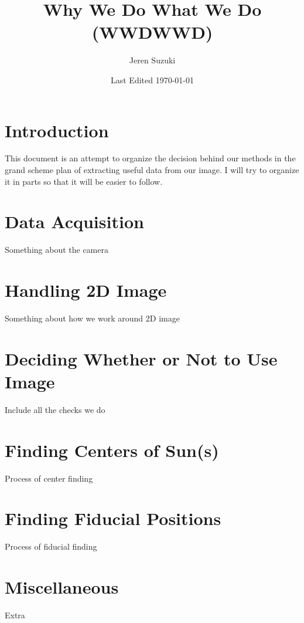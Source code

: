 \documentclass[10pt]{article}
\title{Why We Do What We Do (WWDWWD)}
\author{Jeren Suzuki}
\date{Last Edited \today}
\begin{document}
\maketitle
{}
\tableofcontents
{}
\clearpage
{}

\section*{Introduction} %
\label{sec:introduction}
    This document is an attempt to organize the decision behind our methods in the grand scheme plan of extracting useful data from our image. I will try to organize it in parts so that it will be easier to follow.

\section{Data Acquisition} %
\label{sec:data_acquisition}
Something about the camera

\section{Handling 2D Image} %
\label{sec:handling_2d_image}
Something about how we work around 2D image

\section{Deciding Whether or Not to Use Image} %
\label{sec:deciding_whether_or_not_to_use_image}
Include all the checks we do

\section{Finding Centers of Sun(s)} %
\label{sec:finding_centers_of_sun}
Process of center finding

\section{Finding Fiducial Positions} %
\label{sec:finding_fiducial_positions}
Process of fiducial finding

\section{Miscellaneous} %
\label{sec:miscellaneous}
Extra
\end{document}
